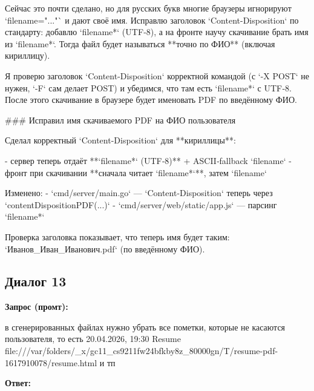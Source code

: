 \documentclass[a4paper, 14pt]{extarticle} %
\begin{document}
\begin{AnswerBlock}

Сейчас это почти сделано, но для русских букв многие браузеры игнорируют `filename="..."` и дают своё имя. Исправлю заголовок `Content-Disposition` по стандарту: добавлю `filename*` (UTF‑8), а на фронте научу скачивание брать имя из `filename*`. Тогда файл будет называться **точно по ФИО** (включая кириллицу).

Я проверю заголовок `Content-Disposition` корректной командой (с `-X POST` не нужен, `-F` сам делает POST) и убедимся, что там есть `filename*` с UTF‑8. После этого скачивание в браузере будет именовать PDF по введённому ФИО.

### Исправил имя скачиваемого PDF на ФИО пользователя

Сделал корректный `Content-Disposition` для **кириллицы**:

- сервер теперь отдаёт **`filename*` (UTF‑8)** + ASCII‑fallback `filename`
- фронт при скачивании **сначала читает `filename*`**, затем `filename`

Изменено:
- `cmd/server/main.go` — `Content-Disposition` теперь через `contentDispositionPDF(...)`
- `cmd/server/web/static/app.js` — парсинг `filename*`

Проверка заголовка показывает, что теперь имя будет таким:
`Иванов_Иван_Иванович.pdf` (по введённому ФИО).

\end{AnswerBlock}

\subsection*{Диалог 13}

\textbf{Запрос (промт):}

\begin{PromptBlock}

в сгенерированных файлах нужно убрать все пометки, которые не касаются пользователя, то есть 20.04.2026, 19:30 Resume file:///var/folders/_x/gc11_cs9211fw24bfkby8z_80000gn/T/resume-pdf-1617910078/resume.html  и тп

\end{PromptBlock}

\textbf{Ответ:}
\end{document}
